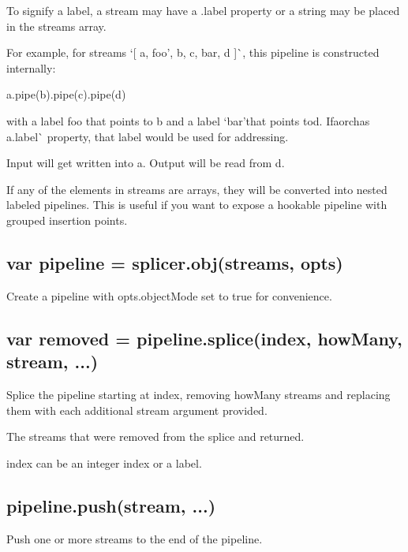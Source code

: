 To signify a label, a stream may have a {\ttfamily .label} property or a string may be placed in the {\ttfamily streams} array.

For example, for streams `\mbox{[} a, \textquotesingle{}foo', b, c, \textquotesingle{}bar\textquotesingle{}, d \mbox{]}\`{}, this pipeline is constructed internally\+:


\begin{DoxyCode}
a.pipe(b).pipe(c).pipe(d)
\end{DoxyCode}


with a label {\ttfamily \textquotesingle{}foo}\textquotesingle{} that points to {\ttfamily b} and a label `\textquotesingle{}bar'{\ttfamily that points to}d{\ttfamily . If}a{\ttfamily or}c{\ttfamily has a}.label\`{} property, that label would be used for addressing.

Input will get written into {\ttfamily a}. Output will be read from {\ttfamily d}.

If any of the elements in {\ttfamily streams} are arrays, they will be converted into nested labeled pipelines. This is useful if you want to expose a hookable pipeline with grouped insertion points.

\subsection*{var pipeline = splicer.\+obj(streams, opts)}

Create a {\ttfamily pipeline} with {\ttfamily opts.\+object\+Mode} set to true for convenience.

\subsection*{var removed = pipeline.\+splice(index, how\+Many, stream, ...)}

Splice the pipeline starting at {\ttfamily index}, removing {\ttfamily how\+Many} streams and replacing them with each additional {\ttfamily stream} argument provided.

The streams that were removed from the splice and returned.

{\ttfamily index} can be an integer index or a label.

\subsection*{pipeline.\+push(stream, ...)}

Push one or more streams to the end of the pipeline.

